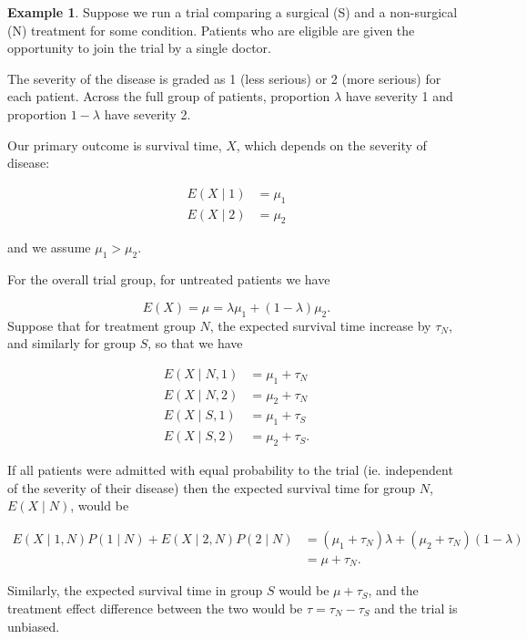 \documentclass[
  openany]{book}
\theoremstyle{definition}
\theoremstyle{definition}
\newtheorem{example}{Example}[chapter]
\theoremstyle{definition}
\theoremstyle{definition}
\theoremstyle{remark}
\begin{document}
\begin{example}
Suppose we run a trial comparing a surgical (S) and a non-surgical (N) treatment for some condition. Patients who are eligible are given the opportunity to join the trial by a single doctor.

The severity of the disease is graded as 1 (less serious) or 2 (more serious) for each patient. Across the full group of patients, proportion \(\lambda\) have severity 1 and proportion \(1-\lambda\) have severity 2.

Our primary outcome is survival time, \(X\), which depends on the severity of disease:

\begin{align*}
E\left(X\mid{1}\right) & = \mu_1\\
E\left(X\mid{2}\right) & = \mu_2
\end{align*}

and we assume \(\mu_1>\mu_2\).

For the overall trial group, for untreated patients we have

\[ E\left(X\right) = \mu = \lambda \mu_1 + \left(1-\lambda\right)\mu_2.\]
Suppose that for treatment group \(N\), the expected survival time increase by \(\tau_N\), and similarly for group \(S\), so that we have

\begin{align*}
E\left(X\mid{N,1}\right) & = \mu_1 + \tau_N\\
E\left(X\mid{N,2}\right) & = \mu_2 + \tau_N\\
E\left(X\mid{S,1}\right) & = \mu_1 + \tau_S\\
E\left(X\mid{S,2}\right) & = \mu_2 + \tau_S.
\end{align*}

If all patients were admitted with equal probability to the trial (ie. independent of the severity of their disease) then the expected survival time for group \(N\), \(E\left(X\mid{N}\right)\), would be

\begin{align*}
E\left(X\mid{1,N}\right)P\left(1\mid{N}\right) +  E\left(X\mid{2,N}\right)P\left(2\mid{N}\right)& = \left(\mu_1 + \tau_N\right)\lambda + \left(\mu_2+\tau_N\right)\left(1-\lambda\right)\\
& = \mu + \tau_N.
\end{align*}

Similarly, the expected survival time in group \(S\) would be \(\mu+\tau_S\), and the treatment effect difference between the two would be \(\tau = \tau_N - \tau_S\) and the trial is unbiased.


\end{example}
\end{document}
